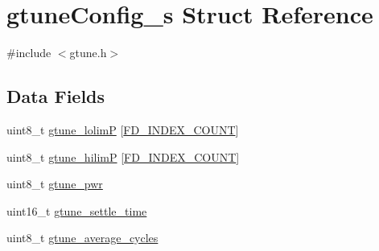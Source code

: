 \hypertarget{structgtuneConfig__s}{\section{gtune\+Config\+\_\+s Struct Reference}
\label{structgtuneConfig__s}
}


{\ttfamily \#include $<$gtune.\+h$>$}

\subsection*{Data Fields}
\begin{DoxyCompactItemize}
\item 
uint8\+\_\+t \hyperlink{structgtuneConfig__s_a0ba693c38d653cd05cccc7de4745f6a0}{gtune\+\_\+lolim\+P} \mbox{[}\hyperlink{axis_8h_af5b0c350685b5d92e9590d8d9dc4cdc2a6b6b744ba6159ba4e79b4ae84ced18df}{F\+D\+\_\+\+I\+N\+D\+E\+X\+\_\+\+C\+O\+U\+N\+T}\mbox{]}
\item 
uint8\+\_\+t \hyperlink{structgtuneConfig__s_abee4333fa0c23a838f8e2909c12e8470}{gtune\+\_\+hilim\+P} \mbox{[}\hyperlink{axis_8h_af5b0c350685b5d92e9590d8d9dc4cdc2a6b6b744ba6159ba4e79b4ae84ced18df}{F\+D\+\_\+\+I\+N\+D\+E\+X\+\_\+\+C\+O\+U\+N\+T}\mbox{]}
\item 
uint8\+\_\+t \hyperlink{structgtuneConfig__s_ac4d72215fa2899f8647adc91da057fb5}{gtune\+\_\+pwr}
\item 
uint16\+\_\+t \hyperlink{structgtuneConfig__s_a6214b68b8fc067f0f02ddf5558255dcc}{gtune\+\_\+settle\+\_\+time}
\item 
uint8\+\_\+t \hyperlink{structgtuneConfig__s_a1c3f18b7d759297863b37e0896fcd343}{gtune\+\_\+average\+\_\+cycles}
\end{DoxyCompactItemize}


